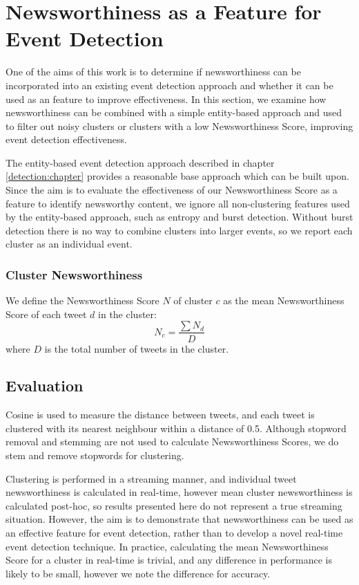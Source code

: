 
\section{Newsworthiness as a Feature for Event Detection}
\label{scoring:sec:detection}

One of the aims of this work is to determine if newsworthiness can be incorporated into an existing event detection approach and whether it can be used as an feature to improve effectiveness.
In this section, we examine how newsworthiness can be combined with a simple entity-based approach and used to filter out noisy clusters or clusters with a low Newsworthiness Score, improving event detection effectiveness.

The entity-based event detection approach described in chapter \ref{detection:chapter} provides a reasonable base approach which can be built upon.
Since the aim is to evaluate the effectiveness of our Newsworthiness Score as a feature to identify newsworthy content, we ignore all non-clustering features used by the entity-based approach, such as entropy and burst detection.
Without burst detection there is no way to combine clusters into larger events, so we report each cluster as an individual event.

\subsubsection{Cluster Newsworthiness}

We define the Newsworthiness Score \(N\) of cluster \(c\) as the mean Newsworthiness Score of each tweet \(d\) in the cluster:
\begin{displaymath}
	N_c = \frac{\sum{N_d}}{D}
\end{displaymath}
where \(D\) is the total number of tweets in the cluster.

\subsection{Evaluation}
\label{scoring:sec:detectionEval}

Cosine is used to measure the distance between tweets, and each tweet is clustered with its nearest neighbour within a distance of 0.5.
Although stopword removal and stemming are not used to calculate Newsworthiness Scores, we do stem and remove stopwords for clustering.

Clustering is performed in a streaming manner, and individual tweet newsworthiness is calculated in real-time, however mean cluster newsworthiness is calculated post-hoc, so results presented here do not represent a true streaming situation.
However, the aim is to demonstrate that newsworthiness can be used as an effective feature for event detection, rather than to develop a novel real-time event detection technique.
In practice, calculating the mean Newsworthiness Score for a cluster in real-time is trivial, and any difference in performance is likely to be small, however we note the difference for accuracy.

